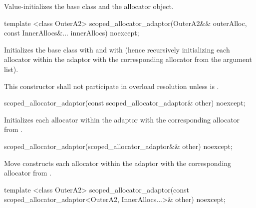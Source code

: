 \begin{itemdescr}
\pnum
\effects Value-initializes the  base class and the  allocator
object.
\end{itemdescr}

%
\begin{itemdecl}
template <class OuterA2>
  scoped_allocator_adaptor(OuterA2&& outerAlloc,
                           const InnerAllocs&... innerAllocs) noexcept;
\end{itemdecl}

\begin{itemdescr}
\pnum
\effects Initializes the  base class with
 and  with 
(hence recursively initializing each allocator within the adaptor with the corresponding
allocator from the argument list).

\pnum
\remarks This constructor shall not participate in overload resolution unless
 is .
\end{itemdescr}

%
\begin{itemdecl}
scoped_allocator_adaptor(const scoped_allocator_adaptor& other) noexcept;
\end{itemdecl}

\begin{itemdescr}
\pnum
\effects Initializes each allocator within the adaptor with the corresponding allocator
from .
\end{itemdescr}

%
\begin{itemdecl}
scoped_allocator_adaptor(scoped_allocator_adaptor&& other) noexcept;
\end{itemdecl}

\begin{itemdescr}
\pnum
\effects Move constructs each allocator within the adaptor with the corresponding allocator
from .
\end{itemdescr}

%
\begin{itemdecl}
template <class OuterA2>
  scoped_allocator_adaptor(const scoped_allocator_adaptor<OuterA2,
                                                          InnerAllocs...>& other) noexcept;
\end{itemdecl}

